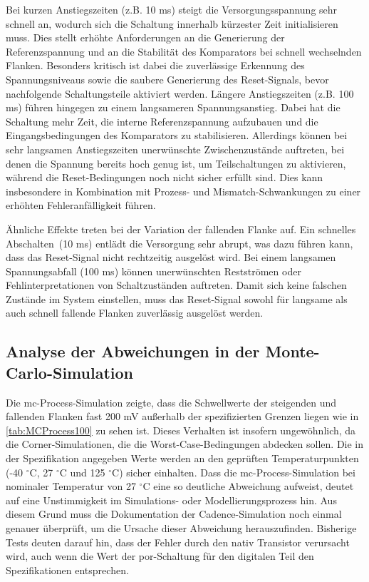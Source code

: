 Bei kurzen Anstiegszeiten (z.B. 10 ms) steigt die Versorgungsspannung sehr schnell an, wodurch sich die Schaltung innerhalb kürzester Zeit initialisieren muss. Dies stellt erhöhte Anforderungen an die Generierung der Referenzspannung und an die Stabilität des Komparators bei schnell wechselnden Flanken. Besonders kritisch ist dabei die zuverlässige Erkennung des Spannungsniveaus sowie die saubere Generierung des Reset-Signals, bevor nachfolgende Schaltungsteile aktiviert werden. Längere Anstiegszeiten (z.B. 100 ms) führen hingegen zu einem langsameren Spannungsanstieg. Dabei hat die Schaltung mehr Zeit, die interne Referenzspannung aufzubauen und die Eingangsbedingungen des Komparators zu stabilisieren. Allerdings können bei sehr langsamen Anstiegszeiten unerwünschte Zwischenzustände auftreten, bei denen die Spannung bereits hoch genug ist, um Teilschaltungen zu aktivieren, während die Reset-Bedingungen noch nicht sicher erfüllt sind. Dies kann insbesondere in Kombination mit Prozess- und Mismatch-Schwankungen zu einer erhöhten Fehleranfälligkeit führen.

Ähnliche Effekte treten bei der Variation der fallenden Flanke auf. Ein schnelles Abschalten~(10 ms) entlädt die Versorgung sehr abrupt, was dazu führen kann, dass das Reset-Signal nicht rechtzeitig ausgelöst wird. Bei einem langsamen Spannungsabfall (100 ms) können unerwünschten Restströmen oder Fehlinterpretationen von Schaltzuständen auftreten. Damit sich keine falschen Zustände im System einstellen, muss das Reset-Signal sowohl für langsame als auch schnell fallende Flanken zuverlässig ausgelöst werden. 

\subsection{Analyse der Abweichungen in der Monte-Carlo-Simulation}
Die \gls{mc}-Process-Simulation zeigte, dass die Schwellwerte der steigenden und fallenden Flanken fast 200 mV außerhalb der spezifizierten Grenzen liegen wie in \autoref{tab:MCProcess100} zu sehen ist. Dieses Verhalten ist insofern ungewöhnlich, da die Corner-Simulationen, die die Worst-Case-Bedingungen abdecken sollen. Die in der Spezifikation angegeben Werte werden an den geprüften Temperaturpunkten (-40 $^{\circ}$C, 27 $^{\circ}$C und 125 $^{\circ}$C) sicher einhalten. Dass die \gls{mc}-Process-Simulation bei nominaler Temperatur von 27 $^{\circ}$C eine so deutliche Abweichung aufweist, deutet auf eine Unstimmigkeit im Simulations- oder Modellierungsprozess hin. Aus diesem Grund muss die Dokumentation der Cadence-Simulation noch einmal genauer überprüft, um die Ursache dieser Abweichung herauszufinden. Bisherige Tests deuten darauf hin, dass der Fehler durch den nativ Transistor verursacht wird, auch wenn die Wert der \gls{por}-Schaltung für den digitalen Teil den Spezifikationen entsprechen. 


